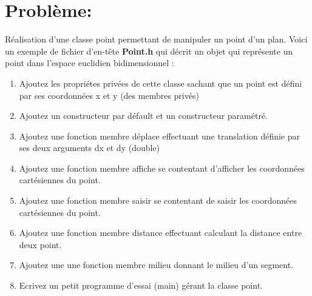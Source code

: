 \section*{Problème:}

Réalisation d'une classe point permettant de manipuler un point d'un plan. Voici un exemple de fichier d'en-tête \textbf{Point.h} qui décrit un objet qui représente un point dans l'espace euclidien bidimensionnel :



%

\begin{enumerate}
    \item Ajoutez les propriétes privées de cette classe sachant que un point est défini par ses coordonnées x et y (des membres privés)

    \item Ajoutez un constructeur par défault et un constructeur paramétré.

    \item Ajoutez une fonction membre déplace effectuant une translation définie par ses deux arguments dx et dy (double)

    \item Ajoutez une fonction membre affiche se contentant d'afficher les coordonnées cartésiennes du point.

    \item Ajoutez une fonction membre saisir se contentant de saisir les coordonnées cartésiennes du point.

    \item Ajoutez une fonction membre distance effectuant calculant la distance entre deux point.

    \item Ajoutez une une fonction membre milieu donnant le milieu d'un segment.

    \item Ecrivez un petit programme d'essai (main) gérant la classe point.

\end{enumerate}
